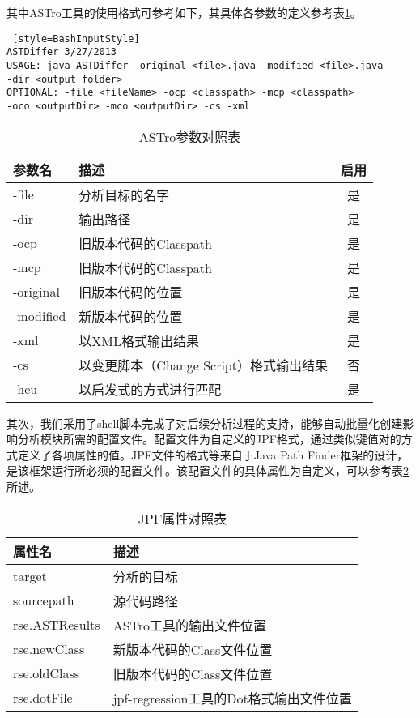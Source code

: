 其中ASTro工具的使用格式可参考如下，其具体各参数的定义参考表\ref {ASTro}。

\begin{lstlisting} [style=BashInputStyle]
ASTDiffer 3/27/2013
USAGE: java ASTDiffer -original <file>.java -modified <file>.java 
-dir <output folder>
OPTIONAL: -file <fileName> -ocp <classpath> -mcp <classpath> 
-oco <outputDir> -mco <outputDir> -cs -xml
\end{lstlisting}	

\begin{table}
	\caption{ASTro参数对照表}
	\label{ASTro}
	\centering
	\begin{tabular}{llc}
		\toprule[1.5pt] 
		{\heiti 参数名} & {\heiti 描述} & {\heiti 启用}\\\midrule[1pt]
		-file & 分析目标的名字 & 是 \\
		-dir & 输出路径 & 是 \\
		-ocp & 旧版本代码的Classpath & 是\\
		-mcp & 旧版本代码的Classpath & 是\\
		-original    & 旧版本代码的位置 & 是\\
		-modified   & 新版本代码的位置 & 是\\
		-xml   & 以XML格式输出结果 & 是\\
		-cs   & 以变更脚本（Change Script）格式输出结果 & 否\\
		-heu   & 以启发式的方式进行匹配 & 是\\
		\bottomrule[1.5pt]
	\end{tabular}	
\end{table}

其次，我们采用了shell脚本完成了对后续分析过程的支持，能够自动批量化创建影响分析模块所需的配置文件。配置文件为自定义的JPF格式，通过类似键值对的方式定义了各项属性的值。JPF文件的格式等来自于Java Path Finder框架的设计，是该框架运行所必须的配置文件。该配置文件的具体属性为自定义，可以参考表\ref {JPF_prop}所述。

\begin{table}
	\caption{JPF属性对照表}
	\label{JPF_prop}
	\centering
	\begin{tabular*}{\linewidth}{lp{10cm}}
		\toprule[1.5pt]
		{\heiti 属性名} & {\heiti 描述} \\\midrule[1pt]
		target & 分析的目标 \\
		sourcepath & 源代码路径\\
		rse.ASTResults & ASTro工具的输出文件位置\\
		rse.newClass & 新版本代码的Class文件位置\\
		rse.oldClass    & 旧版本代码的Class文件位置\\
		rse.dotFile   & jpf-regression工具的Dot格式输出文件位置\\
		\bottomrule[1.5pt]
	\end{tabular*}
\end{table}


